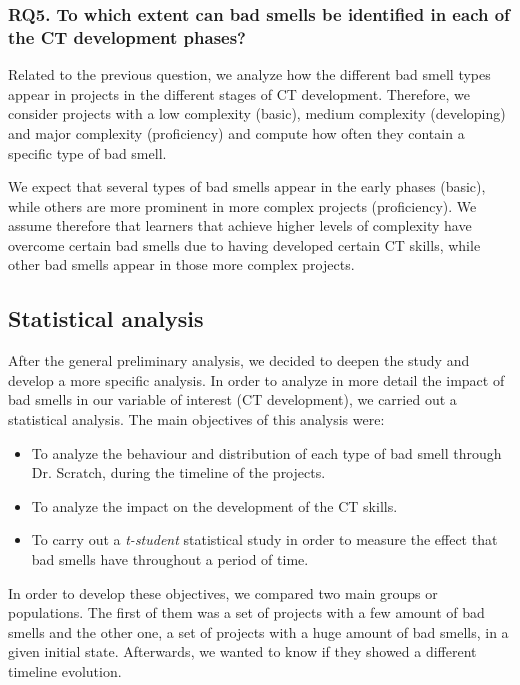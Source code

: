 \subsubsection{RQ5. To which extent can bad smells be identified in each of the CT development phases?}
\label{subsubsec:RQ5}

Related to the previous question, we analyze how the different bad smell types appear in projects in the different stages of CT development. Therefore, we consider projects with a low complexity (basic), medium complexity (developing) and major complexity (proficiency) and compute how often they contain a specific type of bad smell.

We expect that several types of bad smells appear in the early phases (basic), while others are more prominent in more complex projects (proficiency). We assume therefore that learners that achieve higher levels of complexity have overcome certain bad smells due to having developed certain CT skills, while other bad smells appear in those more complex projects.


\subsection{Statistical analysis}
\label{subsec:statisticalanalysis}

After the general preliminary analysis, we decided to deepen the study and develop a more specific analysis. In order to analyze in more detail the impact of bad smells in our variable of interest (CT development), we carried out a statistical analysis. The main objectives of this analysis were: 

\begin{itemize}
    \item To analyze the behaviour and distribution of each type of bad smell through Dr. Scratch, during the timeline of the projects.
    \item To analyze the impact on the development of the CT skills.
    \item To carry out a \textit{t-student} statistical study in order to measure the effect that bad smells have throughout a period of time. 
\end{itemize}

In order to develop these objectives, we compared two main groups or populations. The first of them was a set of projects with a few amount of bad smells and the other one, a set of projects with a huge amount of bad smells, in a given initial state. Afterwards, we wanted to know if they showed a different timeline evolution.

